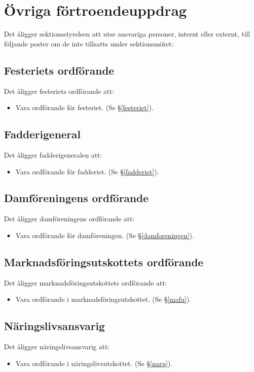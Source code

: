 \documentclass{datateknologsektionen-document}
\begin{document}
\section{Övriga förtroendeuppdrag}

Det åligger sektionsstyrelsen att utse ansvariga personer, internt eller externt, till följande poster
om de inte tillsatts under sektionsmötet:

\subsection{Festeriets ordförande}
Det åligger festeriets ordförande att:
\begin{itemize}
  \item Vara ordförande för festeriet. (Se \S \ref{festeriet}).
\end{itemize}

\subsection{Fadderigeneral}
Det åligger fadderigeneralen att:
\begin{itemize}
  \item Vara ordförande för fadderiet. (Se \S \ref{fadderiet}).
\end{itemize}
\subsection{Damföreningens ordförande}
Det åligger damföreningens ordförande att:
\begin{itemize}
  \item Vara ordförande för damföreningen. (Se \S \ref{damforeningen}).
\end{itemize}
\subsection{Marknadsföringsutskottets ordförande}
Det åligger marknadsföringsutskottets ordförande att:
\begin{itemize}
  \item Vara ordförande i marknadsföringsutskottet. (Se \S \ref{mafu}).
\end{itemize}
\subsection{Näringslivsansvarig}
Det åligger näringslivsansvarig att:
\begin{itemize}
  \item Vara ordförande i näringslivsutskottet. (Se \S \ref{naru}).
\end{itemize}
\end{document}
